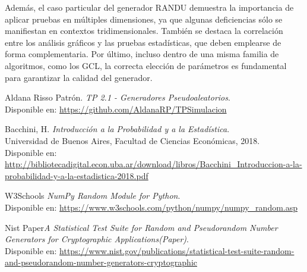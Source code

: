 \documentclass{article}
\begin{document}
Además, el caso particular del generador RANDU demuestra la importancia de aplicar pruebas en múltiples dimensiones, ya que algunas deficiencias sólo se manifiestan en contextos tridimensionales. También se destaca la correlación entre los análisis gráficos y las pruebas estadísticas, que deben emplearse de forma complementaria. Por último, incluso dentro de una misma familia de algoritmos, como los GCL, la correcta elección de parámetros es fundamental para garantizar la calidad del generador.

\newpage
  
\begin{thebibliography}{99}

Aldana Risso Patrón. \textit{TP 2.1 - Generadores Pseudoaleatorios}.\\
Disponible en: \url{https://github.com/AldanaRP/TPSimulacion}


Bacchini, H. \textit{Introducción a la Probabilidad y a la Estadística}.\\
Universidad de Buenos Aires, Facultad de Ciencias Económicas, 2018.\\
Disponible en: \url{http://bibliotecadigital.econ.uba.ar/download/libros/Bacchini_Introduccion-a-la-probabilidad-y-a-la-estadistica-2018.pdf}

W3Schools \textit{NumPy Random Module for Python}.\\
Disponible en: \url{https://www.w3schools.com/python/numpy/numpy_random.asp}

 Nist Paper\textit{A Statistical Test Suite for Random and Pseudorandom Number Generators for Cryptographic Applications(Paper)}.\\
Disponible en: \url{https://www.nist.gov/publications/statistical-test-suite-random-and-pseudorandom-number-generators-cryptographic}

\end{thebibliography}
\end{document}
